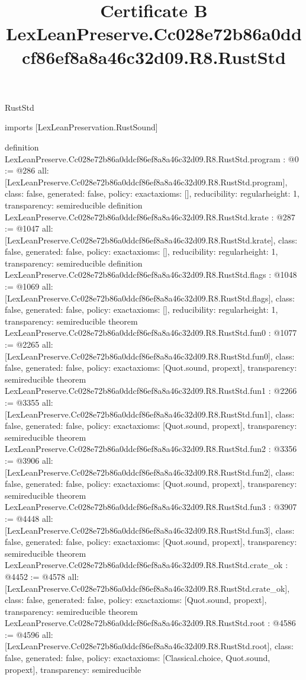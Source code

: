 \begin{lexlean}{RustStd}
\title{Certificate B LexLeanPreserve.Cc028e72b86a0ddcf86ef8a8a46c32d09.R8.RustStd}
\begin{coremodule}
imports [LexLeanPreservation.RustSound]

definition LexLeanPreserve.Cc028e72b86a0ddcf86ef8a8a46c32d09.R8.RustStd.program : @0 := @286 {
  all: [LexLeanPreserve.Cc028e72b86a0ddcf86ef8a8a46c32d09.R8.RustStd.program],
  class: false,
  generated: false,
  policy: exact{axioms: []},
  reducibility: regular{height: 1},
  transparency: semireducible
}
definition LexLeanPreserve.Cc028e72b86a0ddcf86ef8a8a46c32d09.R8.RustStd.krate : @287 := @1047 {
  all: [LexLeanPreserve.Cc028e72b86a0ddcf86ef8a8a46c32d09.R8.RustStd.krate],
  class: false,
  generated: false,
  policy: exact{axioms: []},
  reducibility: regular{height: 1},
  transparency: semireducible
}
definition LexLeanPreserve.Cc028e72b86a0ddcf86ef8a8a46c32d09.R8.RustStd.flags : @1048 := @1069 {
  all: [LexLeanPreserve.Cc028e72b86a0ddcf86ef8a8a46c32d09.R8.RustStd.flags],
  class: false,
  generated: false,
  policy: exact{axioms: []},
  reducibility: regular{height: 1},
  transparency: semireducible
}
theorem LexLeanPreserve.Cc028e72b86a0ddcf86ef8a8a46c32d09.R8.RustStd.fun0 : @1077 := @2265 {
  all: [LexLeanPreserve.Cc028e72b86a0ddcf86ef8a8a46c32d09.R8.RustStd.fun0],
  class: false,
  generated: false,
  policy: exact{axioms: [Quot.sound, propext]},
  transparency: semireducible
}
theorem LexLeanPreserve.Cc028e72b86a0ddcf86ef8a8a46c32d09.R8.RustStd.fun1 : @2266 := @3355 {
  all: [LexLeanPreserve.Cc028e72b86a0ddcf86ef8a8a46c32d09.R8.RustStd.fun1],
  class: false,
  generated: false,
  policy: exact{axioms: [Quot.sound, propext]},
  transparency: semireducible
}
theorem LexLeanPreserve.Cc028e72b86a0ddcf86ef8a8a46c32d09.R8.RustStd.fun2 : @3356 := @3906 {
  all: [LexLeanPreserve.Cc028e72b86a0ddcf86ef8a8a46c32d09.R8.RustStd.fun2],
  class: false,
  generated: false,
  policy: exact{axioms: [Quot.sound, propext]},
  transparency: semireducible
}
theorem LexLeanPreserve.Cc028e72b86a0ddcf86ef8a8a46c32d09.R8.RustStd.fun3 : @3907 := @4448 {
  all: [LexLeanPreserve.Cc028e72b86a0ddcf86ef8a8a46c32d09.R8.RustStd.fun3],
  class: false,
  generated: false,
  policy: exact{axioms: [Quot.sound, propext]},
  transparency: semireducible
}
theorem LexLeanPreserve.Cc028e72b86a0ddcf86ef8a8a46c32d09.R8.RustStd.crate_ok : @4452 := @4578 {
  all: [LexLeanPreserve.Cc028e72b86a0ddcf86ef8a8a46c32d09.R8.RustStd.crate_ok],
  class: false,
  generated: false,
  policy: exact{axioms: [Quot.sound, propext]},
  transparency: semireducible
}
theorem LexLeanPreserve.Cc028e72b86a0ddcf86ef8a8a46c32d09.R8.RustStd.root : @4586 := @4596 {
  all: [LexLeanPreserve.Cc028e72b86a0ddcf86ef8a8a46c32d09.R8.RustStd.root],
  class: false,
  generated: false,
  policy: exact{axioms: [Classical.choice, Quot.sound, propext]},
  transparency: semireducible
}


\end{coremodule}
\end{lexlean}
